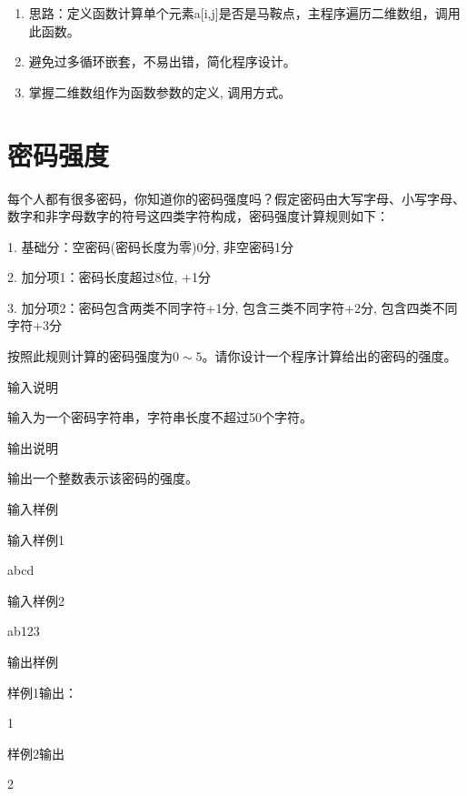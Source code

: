 \begin{note}[要点]
	\begin{enumerate}
		\item 思路：定义函数计算单个元素a[i,j]是否是马鞍点，主程序遍历二维数组，调用此函数。
		\item 避免过多循环嵌套，不易出错，简化程序设计。
		\item 掌握二维数组作为函数参数的定义, 调用方式。
	\end{enumerate}
\end{note}

\section{密码强度}
每个人都有很多密码，你知道你的密码强度吗？假定密码由大写字母、小写字母、数字和非字母数字的符号这四类字符构成，密码强度计算规则如下：

1.	基础分：空密码(密码长度为零)0分, 非空密码1分

2.	加分项1：密码长度超过8位, +1分

3.	加分项2：密码包含两类不同字符+1分, 包含三类不同字符+2分, 包含四类不同字符+3分

按照此规则计算的密码强度为$0\sim 5$。请你设计一个程序计算给出的密码的强度。

输入说明

输入为一个密码字符串，字符串长度不超过50个字符。

输出说明

输出一个整数表示该密码的强度。

输入样例

输入样例1

abcd

输入样例2

ab123

输出样例

样例1输出：

1

样例2输出

2

